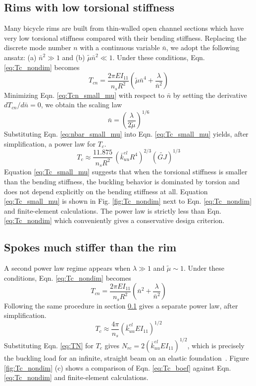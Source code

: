 \documentclass{bmd2016p}
\begin{document}
\subsection{Rims with low torsional stiffness}\label{sec:powerlaw_1}
Many bicycle rims are built from thin-walled open channel sections which have very low torsional stiffness compared with their bending stiffness. Replacing the discrete mode number $n$ with a continuous variable $\bar{n}$, we adopt the following ansatz: (a) $\bar{n}^2 \gg 1$ and (b) $\tilde{\mu}\bar{n}^2 \ll 1$. Under these conditions, Eqn. \ref{eq:Tc_nondim} becomes
	\begin{equation}\label{eq:Tcn_small_mu}
	T_{cn} = \frac{2\pi EI_{11}}{n_sR^2} \left( \tilde{\mu}\bar{n}^4 + \frac{\lambda}{\bar{n}^2}\right)
	\end{equation}
Minimizing Eqn. \ref{eq:Tcn_small_mu} with respect to $\bar{n}$ by setting the derivative $dT_{cn}/d\bar{n}=0$, we obtain the scaling law
	\begin{equation}\label{eq:nbar_small_mu}
	\bar{n} = \left(\frac{\lambda}{2\tilde{\mu}} \right)^{1/6}
	\end{equation}
Substituting Eqn. \ref{eq:nbar_small_mu} into Eqn. \ref{eq:Tc_small_mu} yields, after simplification, a power law for $T_c$.
	\begin{equation}\label{eq:Tc_small_mu}
	T_c \approx \frac{11.875}{n_sR^2} \, \left(\bar{k}_{uu}^{el}R^4 \right)^{2/3} (\widetilde{GJ})^{1/3}
	\end{equation}
Equation \ref{eq:Tc_small_mu} suggests that when the torsional stiffness is smaller than the bending stiffness, the buckling behavior is dominated by torsion and does not depend explicitly on the bending stiffness at all. Equation \ref{eq:Tc_small_mu} is shown in Fig. \ref{fig:Tc_nondim} next to Eqn. \ref{eq:Tc_nondim} and finite-element calculations. The power law is strictly less than Eqn. \ref{eq:Tc_nondim} which conveniently gives a conservative design criterion.


\subsection{Spokes much stiffer than the rim}
A second power law regime appears when $\lambda \gg 1$ and $\tilde{\mu} \sim 1$. Under these conditions, Eqn. \ref{eq:Tc_nondim} becomes
	\begin{equation}\label{eq:Tcn_boef}
	T_{cn} = \frac{2\pi EI_{11}}{n_sR^2}\left(\bar{n}^2 + \frac{\lambda}{\bar{n}^2} \right)
	\end{equation}
Following the same procedure in section \ref{sec:powerlaw_1} gives a separate power law, after simplification.
	\begin{equation}\label{eq:Tc_boef}
	T_c \approx \frac{4\pi}{n_s} \left(\bar{k}_{uu}^{el}EI_{11} \right)^{1/2} 
	\end{equation}
Substituting Eqn. \ref{eq:TN} for $T_c$ gives $N_{rc}=2\left(\bar{k}_{uu}^{el}EI_{11}\right)^{1/2}$, which is precisely the buckling load for an infinite, straight beam on an elastic foundation~\cite{Hetenyi1946b}. Figure \ref{fig:Tc_nondim} (c) shows a comparison of Eqn. \ref{eq:Tc_boef} against Eqn. \ref{eq:Tc_nondim} and finite-element calculations.
\end{document}
